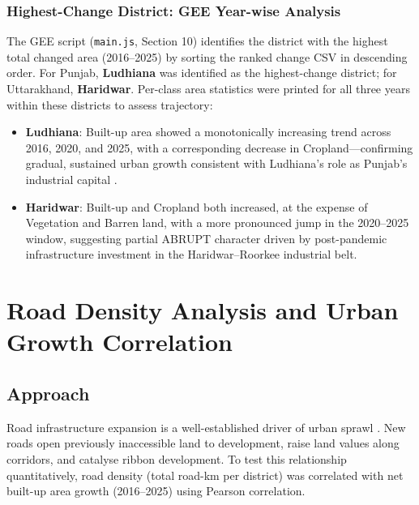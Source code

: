 \documentclass[12pt,a4paper]{article}
\begin{document}
\subsubsection{Highest-Change District: GEE Year-wise Analysis}

The GEE script (\texttt{main.js}, Section 10) identifies the district with the highest total changed area (2016--2025) by sorting the ranked change CSV in descending order. For Punjab, \textbf{Ludhiana} was identified as the highest-change district; for Uttarakhand, \textbf{Haridwar}. Per-class area statistics were printed for all three years within these districts to assess trajectory:

\begin{itemize}
    \item \textbf{Ludhiana}: Built-up area showed a monotonically increasing trend across 2016, 2020, and 2025, with a corresponding decrease in Cropland---confirming gradual, sustained urban growth consistent with Ludhiana's role as Punjab's industrial capital \citep{singh2004green}.
    \item \textbf{Haridwar}: Built-up and Cropland both increased, at the expense of Vegetation and Barren land, with a more pronounced jump in the 2020--2025 window, suggesting partial ABRUPT character driven by post-pandemic infrastructure investment in the Haridwar--Roorkee industrial belt.
\end{itemize}
\section{Road Density Analysis and Urban Growth Correlation}

\subsection{Approach}

Road infrastructure expansion is a well-established driver of urban sprawl \citep{wei2021road}. New roads open previously inaccessible land to development, raise land values along corridors, and catalyse ribbon development. To test this relationship quantitatively, road density (total road-km per district) was correlated with net built-up area growth (2016--2025) using Pearson correlation.
\end{document}
